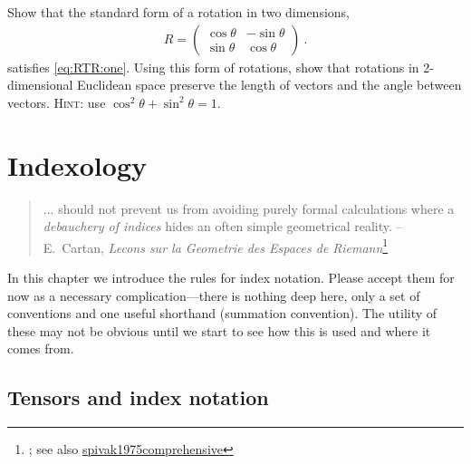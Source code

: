 \documentclass[12pt, oneside]{report}    %
\let\oldsection\section
\def\section{%
  \setcounter{sidenote}{1}%
  \oldsection
}
\begin{document}
\begin{exercise}
Show that the standard form of a rotation in two dimensions,
\begin{align}
R=
    \begin{pmatrix}
    \cos \theta & -\sin\theta \\
    \sin \theta & \cos\theta      
    \end{pmatrix} \ .
\end{align}
satisfies \eqref{eq:RTR:one}. Using this form of rotations, show that rotations in 2-dimensional Euclidean space preserve the length of vectors and the angle between vectors. \textsc{Hint}: use $\cos^2\theta + \sin^2\theta = 1$.
\end{exercise}





\chapter{Indexology}\label{ch:indexology}
\begin{quote}
... should not prevent us from avoiding purely formal calculations where a \emph{debauchery of indices} hides an often simple geometrical reality. -- E.~Cartan, \emph{Lecons sur la Geometrie des Espaces de Riemann}\footnote{\cite{spivak1975comprehensive}; see also \url{spivak1975comprehensive}}
\end{quote} %

In this chapter we introduce the rules for index notation. Please accept them for now as a necessary complication---there is nothing deep here, only a set of conventions and one useful shorthand (summation convention). The utility of these may not be obvious until we start to see how this is used and where it comes from.

\section{Tensors and index notation}
\label{sec:index:notation}
\end{document}
